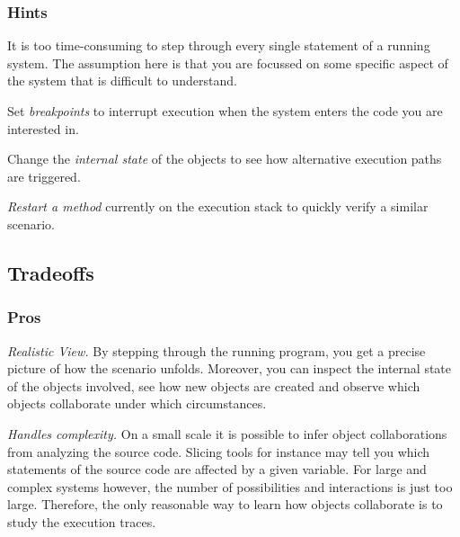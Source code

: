 \documentclass[a4paper,10pt,twoside]{book}
\begin{document}
\subsubsection*{Hints}

It is too time-consuming to step through every single statement of a running system. The assumption here is that you are focussed on some specific aspect of the system that is difficult to understand.

\begin{bulletlist}
\item Set \emph{breakpoints} to interrupt execution when the system enters the code you are interested in.

\item Change the \emph{internal state} of the objects to see how alternative execution paths are triggered.

\item \emph{Restart a method} currently on the execution stack to quickly verify a similar scenario.
\end{bulletlist}

\subsection*{Tradeoffs}

\subsubsection*{Pros}

\begin{bulletlist}
\item \emph{Realistic View.}
By stepping through the running program, you get a precise picture of how the scenario unfolds. Moreover, you can inspect the internal state of the objects involved, see how new objects are created and observe which objects collaborate under which circumstances.

\item \emph{Handles complexity.}
On a small scale it is possible to infer object collaborations from analyzing the source code. Slicing tools for instance may tell you which statements of the source code are affected by a given variable. For large and complex systems however, the number of possibilities and interactions is just too large. Therefore, the only reasonable way to learn how objects collaborate is to study the execution traces.
\end{bulletlist}
\end{document}
